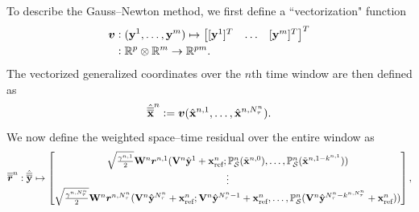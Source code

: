 To describe the Gauss--Newton method, we first define a ``vectorization" function 
\begin{align*}
 \boldsymbol v &\vcentcolon (\mathbf{y}^{1},\ldots,\mathbf{y}^{m} ) \mapsto \begin{bmatrix} [\mathbf{y}^{1}]^T & \ldots & [\mathbf{y}^{m}]^T \end{bmatrix}^T  \\
&\vcentcolon \mathbb{R}^{p} \otimes \mathbb{R}^{m} \rightarrow \mathbb{R}^{pm}.
\end{align*}
The vectorized generalized coordinates over the $n$th time window are then
defined as 
\begin{equation*}
\hat{\overline{\overline{\mathbf {x}}}}^{n} \vcentcolon= 
\boldsymbol v (\hat{\mathbf{x}}^{n,1},\ldots,\hat{\mathbf{x}}^{n,N_{\tau}^{n}} ).
\end{equation*}
We now define the weighted space--time residual over the entire window as
\begin{equation*}
\overline{\overline{\boldsymbol r}}^{n}_{\text{}} : \hat{\overline{\overline{\mathbf{y}}}}^{} \mapsto \begin{bmatrix}
 \sqrt{\frac{\gamma^{n,1}}{2}} \mathbf{W}^{n} \boldsymbol r_{}^{n,1}( \mathbf {V}^{n} \hat{\mathbf{y}}^{1} + \mathbf{x}_\text{ref}^{n}; 
\mathbb{P}_{\mathcal{S}}^{n}( \tilde{\mathbf{x}}^{n,0}),
\ldots , \mathbb{P}_{\mathcal{S}}^{n}( \tilde{\mathbf{x}}^{n,1 - k^{n,1} } )  ) \\
\vdots \\
 \sqrt{\frac{\gamma^{n,N_{\tau}^{n}}}{2}} \mathbf{W}^{n} \boldsymbol r_{}^{n,N_{\tau}^{n}}( \mathbf {V}^{n} \hat{\mathbf{y}}^{N_{\tau}^{n}} + \mathbf{x}_\text{ref}^{n}; \mathbf {V}^{n} \hat{\mathbf{y}}^{N_{\tau}^{n}-1} + \mathbf{x}_\text{ref}^{n} ,  \ldots,\mathbb{P}_{\mathcal{S}}^{n}( \mathbf {V}^{n} \hat{\mathbf{y}}^{N_{\tau}^{n} - k^{n,N_{\tau}^{n}} } + \mathbf{x}_\text{ref}^{n} )) \\
\end{bmatrix},
\end{equation*}
